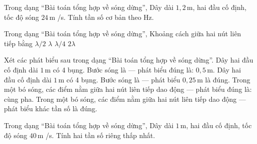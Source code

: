 \begin{ex}
Trong dạng “Bài toán tổng hợp về sóng dừng”, Dây dài $1,2\,\text{m}$, hai đầu cố định, tốc độ sóng $24\,\text{m}$ /s. Tính tần số cơ bản theo Hz.
\end{ex}

\begin{ex}
Trong dạng “Bài toán tổng hợp về sóng dừng”, Khoảng cách giữa hai nút liên tiếp bằng
\choice
{\True $\lambda/2$}
{$\lambda$}
{$\lambda/4$}
{$2\lambda$}
\end{ex}

\begin{ex}
Xét các phát biểu sau trong dạng “Bài toán tổng hợp về sóng dừng”.
\choiceTF
{\True Dây hai đầu cố định dài $1\,\text{m}$ có 4 bụng. Bước sóng là — phát biểu đúng là: $0,5\,\text{m}$.}
{Dây hai đầu cố định dài $1\,\text{m}$ có 4 bụng. Bước sóng là — phát biểu $0,25\,\text{m}$ là đúng.}
{\True Trong một bó sóng, các điểm nằm giữa hai nút liên tiếp dao động — phát biểu đúng là: cùng pha.}
{Trong một bó sóng, các điểm nằm giữa hai nút liên tiếp dao động — phát biểu khác tần số là đúng.}
\end{ex}

\begin{ex}
Trong dạng “Bài toán tổng hợp về sóng dừng”, Dây dài $1\,\text{m}$, hai đầu cố định, tốc độ sóng $40\,\text{m}$ /s. Tính hai tần số riêng thấp nhất.
\choiceTF

\end{ex}

